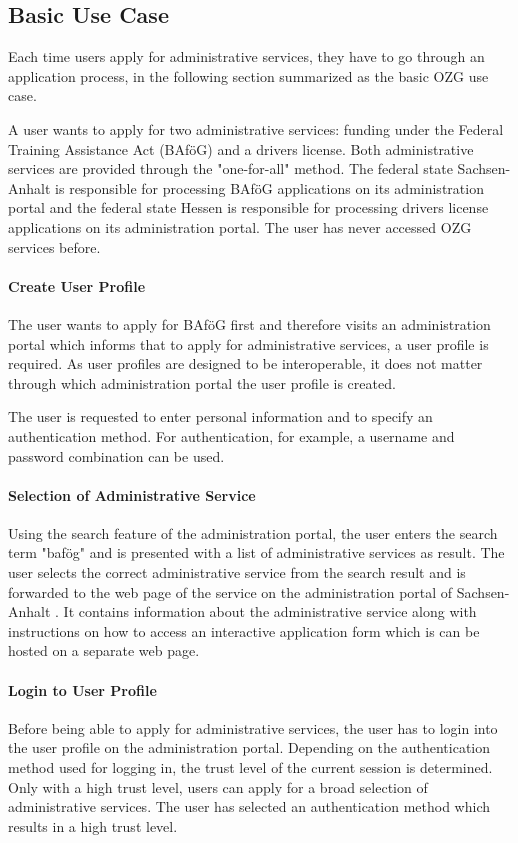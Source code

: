\subsection{Basic Use Case}
Each time users apply for administrative services, they have to go through an application process, in the following section summarized as the basic OZG use case.

A user wants to apply for two administrative services: funding under the Federal Training Assistance Act (BAföG) and a drivers license. Both administrative services are provided through the "one-for-all" method. The federal state Sachsen-Anhalt is responsible for processing BAföG applications on its administration portal and the federal state Hessen is responsible for processing drivers license applications on its administration portal. The user has never accessed OZG services before.

\paragraph{Create User Profile} The user wants to apply for BAföG first and therefore visits an administration portal which informs that to apply for administrative services, a user profile is required. As user profiles are designed to be interoperable, it does not matter through which administration portal the user profile is created.

The user is requested to enter personal information and to specify an authentication method. For authentication, for example, a username and password combination can be used.

\paragraph{Selection of Administrative Service} Using the search feature of the administration portal, the user enters the search term "bafög" and is presented with a list of administrative services as result. The user selects the correct administrative service from the search result and is forwarded to the web page of the service on the administration portal of Sachsen-Anhalt . It contains information about the administrative service along with instructions on how to access an interactive application form which is can be hosted on a separate web page.

\paragraph{Login to User Profile} Before being able to apply for administrative services, the user has to login into the user profile on the administration portal. Depending on the authentication method used for logging in, the trust level of the current session is determined. Only with a high trust level, users can apply for a broad selection of administrative services. The user has selected an authentication method which results in a high trust level.
    
